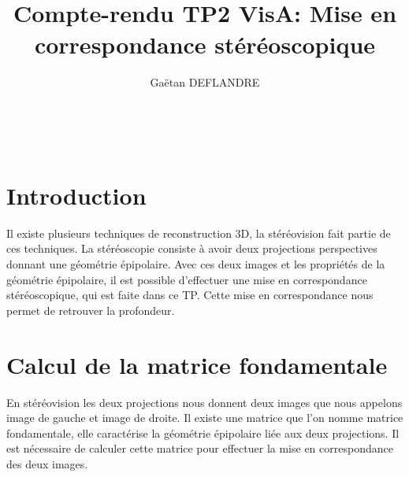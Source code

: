 \documentclass[a4paper,11pt]{article}
\title{
  \noindent\hrulefill \\
  \vspace{10mm} Compte-rendu TP2 VisA: Mise en correspondance stéréoscopique
}
\author{Gaëtan DEFLANDRE}
\begin{document}
\maketitle

\noindent\hrulefill \\


\section{Introduction}
Il existe plusieurs techniques de reconstruction 3D, la stéréovision fait partie de ces techniques.
La stéréoscopie consiste à avoir deux projections perspectives donnant une géométrie épipolaire. 
Avec ces deux images et les propriétés de la géométrie épipolaire, il est possible d'effectuer une 
mise en correspondance stéréoscopique, qui est faite dans ce TP. Cette mise en correspondance nous 
permet de retrouver la profondeur.\\

\newpage

\section{Calcul de la matrice fondamentale}

En stéréovision les deux projections nous donnent deux images que nous appelons image de gauche et 
image de droite. Il existe une matrice que l'on nomme matrice fondamentale, elle caractérise la 
géométrie épipolaire liée aux deux projections. Il est nécessaire de calculer cette matrice pour 
effectuer la mise en correspondance des deux images.\\

\begin{figure}[H]
  \centering
\end{figure}
\end{document}
